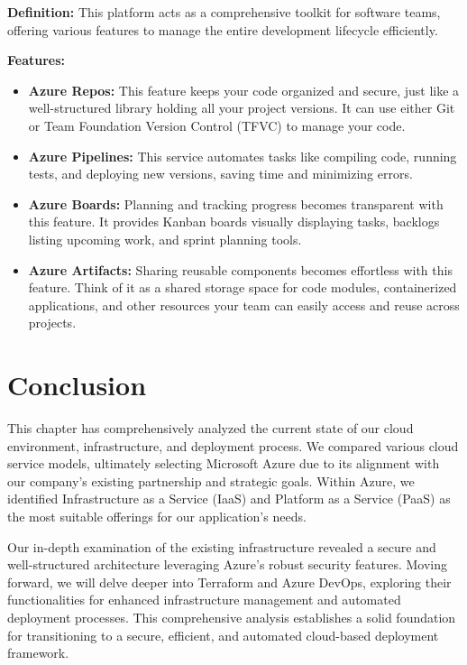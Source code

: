 \textbf{Definition:} This platform acts as a comprehensive toolkit for software teams, offering various features to manage the entire development lifecycle efficiently.
\par
\textbf{Features:}
\begin{itemize}
    \item \textbf{Azure Repos:} This feature keeps your code organized and secure, just like a well-structured library holding all your project versions. It can use either Git or Team Foundation Version Control (TFVC) to manage your code.
    \item \textbf{Azure Pipelines:}  This service automates tasks like compiling code, running tests, and deploying new versions, saving time and minimizing errors.
    \item \textbf{Azure Boards:} Planning and tracking progress becomes transparent with this feature. It provides Kanban boards visually displaying tasks, backlogs listing upcoming work, and sprint planning tools.
    \item \textbf{Azure Artifacts:} Sharing reusable components becomes effortless with this feature. Think of it as a shared storage space for code modules, containerized applications, and other resources your team can easily access and reuse across projects.
\end{itemize}
\section*{Conclusion}
This chapter has comprehensively analyzed the current state of our cloud environment, infrastructure, and deployment process. We compared various cloud service models, ultimately selecting Microsoft Azure due to its alignment with our company's existing partnership and strategic goals. Within Azure, we identified Infrastructure as a Service (IaaS) and Platform as a Service (PaaS) as the most suitable offerings for our application's needs.
\par
Our in-depth examination of the existing infrastructure revealed a secure and well-structured architecture leveraging Azure's robust security features. Moving forward, we will delve deeper into Terraform and Azure DevOps, exploring their functionalities for enhanced infrastructure management and automated deployment processes. This comprehensive analysis establishes a solid foundation for transitioning to a secure, efficient, and automated cloud-based deployment framework.
